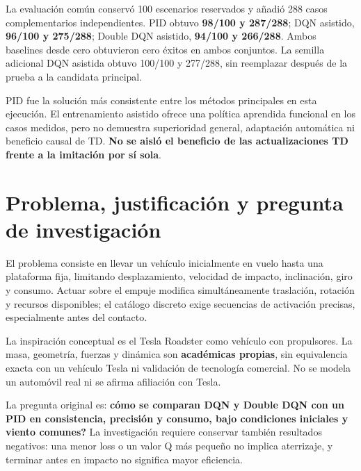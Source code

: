\documentclass[12pt,a4paper]{article}
\begin{document}
La evaluación común conservó 100 escenarios reservados y añadió 288 casos complementarios independientes. PID obtuvo \textbf{98/\allowbreak{}100 y 287/\allowbreak{}288}; DQN asistido,\allowbreak{} \textbf{96/\allowbreak{}100 y 275/\allowbreak{}288}; Double DQN asistido,\allowbreak{} \textbf{94/\allowbreak{}100 y 266/\allowbreak{}288}. Ambos baselines desde cero obtuvieron cero éxitos en ambos conjuntos. La semilla adicional DQN asistida obtuvo 100/\allowbreak{}100 y 277/\allowbreak{}288,\allowbreak{} sin reemplazar después de la prueba a la candidata principal.


PID fue la solución más consistente entre los métodos principales en esta ejecución. El entrenamiento asistido ofrece una política aprendida funcional en los casos medidos,\allowbreak{} pero no demuestra superioridad general,\allowbreak{} adaptación automática ni beneficio causal de TD. \textbf{No se aisló el beneficio de las actualizaciones TD frente a la imitación por sí sola}.



\section{Problema,\allowbreak{} justificación y pregunta de investigación}
El problema consiste en llevar un vehículo inicialmente en vuelo hasta una plataforma fija,\allowbreak{} limitando desplazamiento,\allowbreak{} velocidad de impacto,\allowbreak{} inclinación,\allowbreak{} giro y consumo. Actuar sobre el empuje modifica simultáneamente traslación,\allowbreak{} rotación y recursos disponibles; el catálogo discreto exige secuencias de activación precisas,\allowbreak{} especialmente antes del contacto.


La inspiración conceptual es el Tesla Roadster como vehículo con propulsores. La masa,\allowbreak{} geometría,\allowbreak{} fuerzas y dinámica son \textbf{académicas propias},\allowbreak{} sin equivalencia exacta con un vehículo Tesla ni validación de tecnología comercial. No se modela un automóvil real ni se afirma afiliación con Tesla.


La pregunta original es: \textbf{\textquestiondown{}cómo se comparan DQN y Double DQN con un PID en consistencia,\allowbreak{} precisión y consumo,\allowbreak{} bajo condiciones iniciales y viento comunes?} La investigación requiere conservar también resultados negativos: una menor loss o un valor Q más pequeño no implica aterrizaje,\allowbreak{} y terminar antes en impacto no significa mayor eficiencia.
\end{document}
